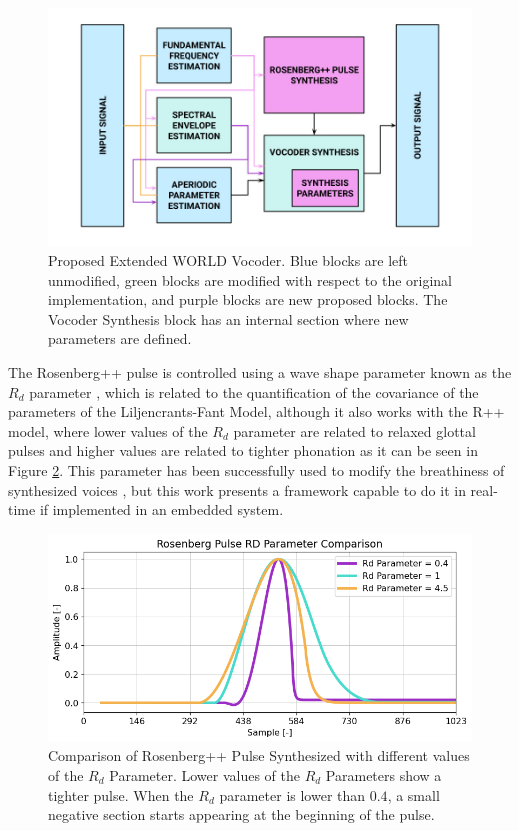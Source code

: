 \documentclass[final,5p,times,twocolumn]{elsarticle}
\begin{document}
\begin{figure}[!htpb]
    \centerline{\includegraphics[width=\columnwidth]{proposed_world.jpeg}}
    \caption{\label{fig:WORLD_blocks} Proposed Extended WORLD Vocoder. Blue blocks are left unmodified, green blocks are modified with respect to the original implementation, and purple blocks are new proposed blocks. The Vocoder Synthesis block has an internal section where new parameters are defined.}
    \raggedright
\end{figure}


The Rosenberg++ pulse is controlled using a wave shape parameter known as the $R_d$ parameter \cite{fant1995lf}, which is related to the quantification of the covariance of the parameters of the Liljencrants-Fant Model, although it also works with the R++ model, where lower values of the $R_d$ parameter are related to relaxed glottal pulses and higher values are related to tighter phonation as it can be seen in Figure \ref{fig:rd_comparison}. This parameter has been successfully used to modify the breathiness of synthesized voices \cite{Degottex_2011} \cite{Degottex_2013} \cite{Murphy_2019}, but this work presents a framework capable to do it in real-time if implemented in an embedded system.

\begin{figure}[!htpb]
    \centerline{\includegraphics[width=\columnwidth]{rosenberg_rd.png}}
    \caption{\label{fig:rd_comparison}Comparison of Rosenberg++ Pulse Synthesized with different values of the $R_d$ Parameter. Lower values of the $R_d$ Parameters show a tighter pulse. When the $R_d$ parameter is lower than $0.4$, a small negative section starts appearing at the beginning of the pulse.}
    \raggedright
\end{figure}
\end{document}
